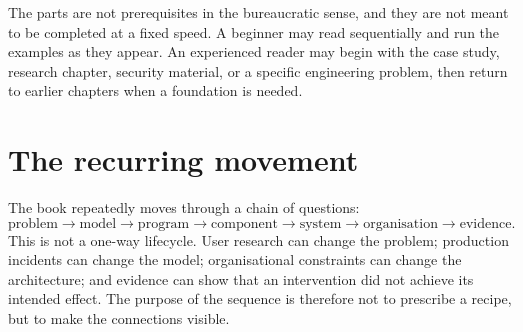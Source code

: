 The parts are not prerequisites in the bureaucratic sense, and they are not meant to be completed at a fixed speed. A beginner may read sequentially and run the examples as they appear. An experienced reader may begin with the case study, research chapter, security material, or a specific engineering problem, then return to earlier chapters when a foundation is needed.

\section*{The recurring movement}
The book repeatedly moves through a chain of questions:
\[
\text{problem} \rightarrow \text{model} \rightarrow \text{program} \rightarrow \text{component} \rightarrow \text{system} \rightarrow \text{organisation} \rightarrow \text{evidence}.
\]
This is not a one-way lifecycle. User research can change the problem; production incidents can change the model; organisational constraints can change the architecture; and evidence can show that an intervention did not achieve its intended effect. The purpose of the sequence is therefore not to prescribe a recipe, but to make the connections visible.
